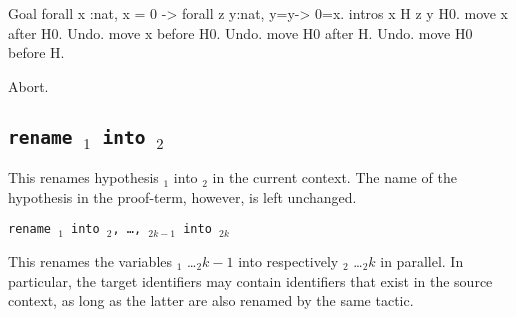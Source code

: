 \begin{coq_example*}
\begin{ErrMsgs}

\item {}

\item {}

\item {}

\end{ErrMsgs}

\Example

\begin{coq_example}
Goal forall x :nat, x = 0 -> forall z y:nat, y=y-> 0=x.
intros x H z y H0.
move x after H0.
Undo.
move x before H0.
Undo.
move H0 after H.
Undo.
move H0 before H.
\end{coq_example}
\begin{coq_eval}
Abort.
\end{coq_eval}

\subsection{\tt rename {\ident$_1$} into {\ident$_2$}}

This renames hypothesis {\ident$_1$} into {\ident$_2$} in the current
context. The name of the hypothesis in the proof-term, however, is left
unchanged.

\begin{Variants}

\item {\tt rename {\ident$_1$} into {\ident$_2$}, \ldots,
    {\ident$_{2k-1}$} into {\ident$_{2k}$}}

This renames the variables {\ident$_1$} \ldots {\ident$_2k-1$} into respectively
{\ident$_2$} \ldots {\ident$_2k$} in parallel. In particular, the target
identifiers may contain identifiers that exist in the source context, as long
as the latter are also renamed by the same tactic.

\end{Variants}

\begin{ErrMsgs}
\item {}
\item {}
\end{ErrMsgs}


\end{coq_example*}
